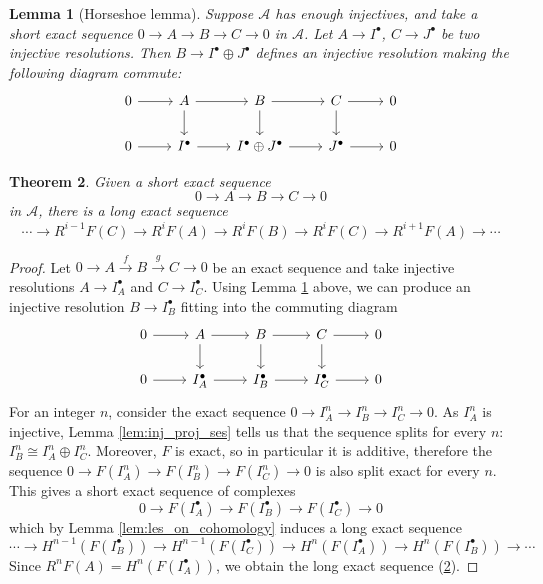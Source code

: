 \documentclass{article}
\def\~#1{\mathscr{#1}}
\def\To#1{\xrightarrow{#1}}
\numberwithin{equation}{section}
\numberwithin{figure}{section}
\theoremstyle{plain}
\newtheorem{thm}{Theorem}[section]
\newtheorem{lem}[thm]{Lemma}
\theoremstyle{definition}
\theoremstyle{remark}
\begin{document}
\begin{lem}[Horseshoe lemma]\label{lem:horseshoe}
    Suppose $\~A$ has enough injectives, and take a short exact sequence $0 \to A \to B \to C \to 0$ in $\~A$. Let $A \to I^\bullet$, $C \to J^\bullet$ be two injective resolutions. Then $B \to I^\bullet \oplus J^\bullet$ defines an injective resolution making the following diagram commute:
    \[\begin{tikzcd}
    0 & A & B & C & 0 \\
    0 & {I^\bullet} & {I^\bullet \oplus J^\bullet} & {J^\bullet} & 0
    \arrow[from=1-1, to=1-2]
    \arrow[from=1-2, to=1-3]
    \arrow[from=1-2, to=2-2]
    \arrow[from=1-3, to=1-4]
    \arrow[from=1-3, to=2-3]
    \arrow[from=1-4, to=1-5]
    \arrow[from=1-4, to=2-4]
    \arrow[from=2-1, to=2-2]
    \arrow[from=2-2, to=2-3]
    \arrow[from=2-3, to=2-4]
    \arrow[from=2-4, to=2-5]
\end{tikzcd}\]
\end{lem}
\begin{thm}\label{eq:right_derived_les}
    Given a short exact sequence
    \[0 \to A \to B \to C \to 0\]
    in $\~A$, there is a long exact sequence
    \begin{equation} \cdots \to R^{i-1}F(C) \to R^iF(A) \to R^iF(B) \to R^iF(C) \to R^{i + 1}F(A) \to \cdots \end{equation}
\end{thm}
\begin{proof}
    Let $0 \to A \To{f} B \To{g} C \to 0$ be an exact sequence and take injective resolutions $A \to I_A^\bullet$ and $C \to I_C^\bullet$. Using Lemma \ref{lem:horseshoe} above, we can produce an injective resolution $B \to I_B^\bullet$ fitting into the commuting diagram
        \[\begin{tikzcd}
    0 & A & B & C & 0 \\
    0 & {I_A^\bullet} & {I_B^\bullet} & {I_C^\bullet} & 0
    \arrow[from=1-1, to=1-2]
    \arrow[from=1-2, to=1-3]
    \arrow[from=1-2, to=2-2]
    \arrow[from=1-3, to=1-4]
    \arrow[from=1-3, to=2-3]
    \arrow[from=1-4, to=1-5]
    \arrow[from=1-4, to=2-4]
    \arrow[from=2-1, to=2-2]
    \arrow[from=2-2, to=2-3]
    \arrow[from=2-3, to=2-4]
    \arrow[from=2-4, to=2-5]
\end{tikzcd}\]
For an integer $n$, consider the exact sequence $0 \to I_A^n \to I_B^n \to I_C^n \to 0$. As $I_A^n$ is injective, Lemma \ref{lem:inj_proj_ses} tells us that the sequence splits for every $n$: $I^n_B \cong I_A^n \oplus I_C^n$. Moreover, $F$ is exact, so in particular it is additive, therefore the sequence $0 \to F(I_A^n) \to F(I_B^n) \to F(I_C^n) \to 0$ is also split exact for every $n$. This gives a short exact sequence of complexes
\[0 \to F(I_A^\bullet) \to F(I_B^\bullet) \to F(I_C^\bullet) \to 0\]
which by Lemma \ref{lem:les_on_cohomology} induces a long exact sequence
\[\cdots \to H^{n-1}(F(I_B^\bullet)) \to H^{n-1}(F(I_C^\bullet)) \to H^n(F(I_A^\bullet)) \to H^n(F(I_B^\bullet)) \to \cdots\]
Since $R^nF(A) = H^n(F(I_A^\bullet))$, we obtain the long exact sequence (\ref{eq:right_derived_les}).
\end{proof}
\end{document}
